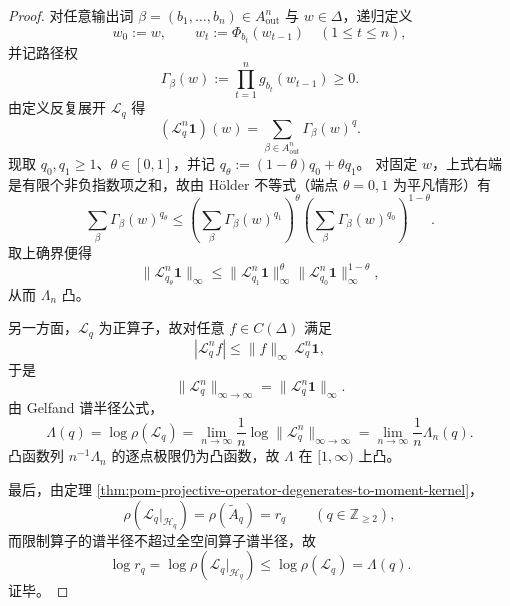 \begin{proof}
对任意输出词
\(
\beta=(b_1,\dots,b_n)\in A_{\mathrm{out}}^n
\)
与 \(w\in\Delta\)，递归定义
\[
w_0:=w,
\qquad
w_t:=\Phi_{b_t}(w_{t-1})\quad(1\le t\le n),
\]
并记路径权
\[
\Gamma_\beta(w):=\prod_{t=1}^n g_{b_t}(w_{t-1})\ge 0.
\]
由定义反复展开 \(\mathcal L_q\) 得
\[
(\mathcal L_q^n\mathbf 1)(w)=\sum_{\beta\in A_{\mathrm{out}}^n}\Gamma_\beta(w)^q.
\]
现取 \(q_0,q_1\ge 1\)、\(\theta\in[0,1]\)，并记
\(
q_\theta:=(1-\theta)q_0+\theta q_1
\)。
对固定 \(w\)，上式右端是有限个非负指数项之和，故由 Hölder 不等式（端点 \(\theta=0,1\) 为平凡情形）有
\[
\sum_{\beta}\Gamma_\beta(w)^{q_\theta}
\le
\left(\sum_{\beta}\Gamma_\beta(w)^{q_1}\right)^\theta
\left(\sum_{\beta}\Gamma_\beta(w)^{q_0}\right)^{1-\theta}.
\]
取上确界便得
\[
\|\mathcal L_{q_\theta}^n\mathbf 1\|_\infty
\le
\|\mathcal L_{q_1}^n\mathbf 1\|_\infty^\theta
\|\mathcal L_{q_0}^n\mathbf 1\|_\infty^{1-\theta},
\]
从而 \(\Lambda_n\) 凸。

另一方面，\(\mathcal L_q\) 为正算子，故对任意 \(f\in C(\Delta)\) 满足
\[
|\mathcal L_q^n f|
\le
\|f\|_\infty\,\mathcal L_q^n\mathbf 1,
\]
于是
\[
\|\mathcal L_q^n\|_{\infty\to\infty}
=
\|\mathcal L_q^n\mathbf 1\|_\infty.
\]
由 Gelfand 谱半径公式，
\[
\Lambda(q)
=
\log \rho(\mathcal L_q)
=
\lim_{n\to\infty}\frac{1}{n}\log \|\mathcal L_q^n\|_{\infty\to\infty}
=
\lim_{n\to\infty}\frac{1}{n}\Lambda_n(q).
\]
凸函数列 \(n^{-1}\Lambda_n\) 的逐点极限仍为凸函数，故 \(\Lambda\) 在 \([1,\infty)\) 上凸。

最后，由定理 \ref{thm:pom-projective-operator-degenerates-to-moment-kernel}，
\[
\rho(\mathcal L_q|_{\mathcal H_q})=\rho(\widetilde A_q)=r_q
\qquad(q\in\mathbb Z_{\ge 2}),
\]
而限制算子的谱半径不超过全空间算子谱半径，故
\[
\log r_q
=
\log\rho(\mathcal L_q|_{\mathcal H_q})
\le
\log\rho(\mathcal L_q)
=
\Lambda(q).
\]
证毕。
\end{proof}

